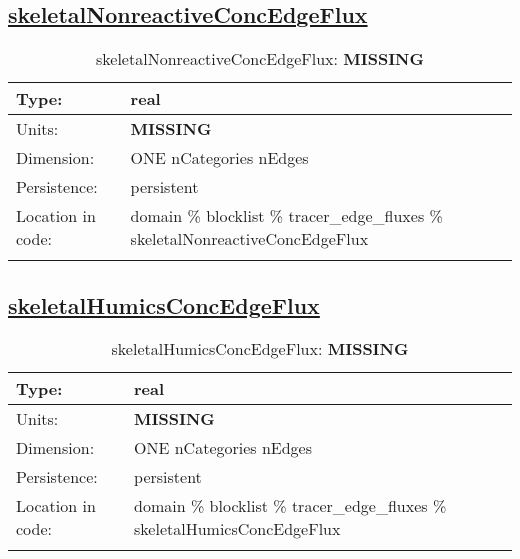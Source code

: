 \subsection[skeletalNonreactiveConcEdgeFlux]{\hyperref[sec:var_tab_tracer_edge_fluxes]{skeletalNonreactiveConcEdgeFlux}}
\label{subsec:var_sec_tracer_edge_fluxes_skeletalNonreactiveConcEdgeFlux}
\begin{center}
\begin{longtable}{| p{2.0in} | p{4.0in} |}
        \hline 
        Type: & real \\
        \hline 
        Units: & {\bf \color{red} MISSING} \\
        \hline 
        Dimension: & ONE nCategories nEdges \\
        \hline 
        Persistence: & persistent \\
        \hline 
         Location in code: & domain \% blocklist \% tracer\_edge\_fluxes \% skeletalNonreactiveConcEdgeFlux \\
         \hline 
    \caption{skeletalNonreactiveConcEdgeFlux: {\bf \color{red} MISSING}}
\end{longtable}
\end{center}
\subsection[skeletalHumicsConcEdgeFlux]{\hyperref[sec:var_tab_tracer_edge_fluxes]{skeletalHumicsConcEdgeFlux}}
\label{subsec:var_sec_tracer_edge_fluxes_skeletalHumicsConcEdgeFlux}
\begin{center}
\begin{longtable}{| p{2.0in} | p{4.0in} |}
        \hline 
        Type: & real \\
        \hline 
        Units: & {\bf \color{red} MISSING} \\
        \hline 
        Dimension: & ONE nCategories nEdges \\
        \hline 
        Persistence: & persistent \\
        \hline 
         Location in code: & domain \% blocklist \% tracer\_edge\_fluxes \% skeletalHumicsConcEdgeFlux \\
         \hline 
    \caption{skeletalHumicsConcEdgeFlux: {\bf \color{red} MISSING}}
\end{longtable}
\end{center}
